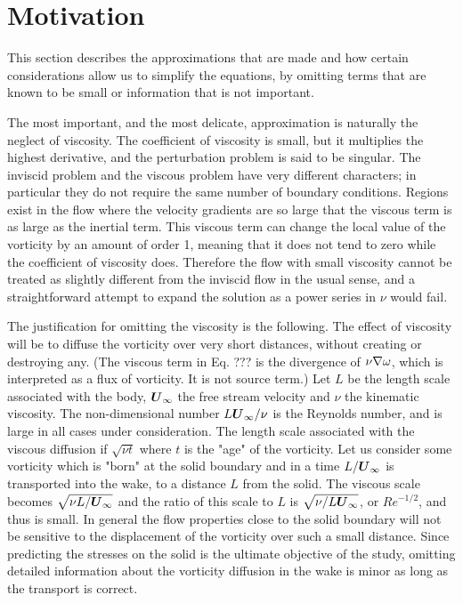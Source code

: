 



\section{Motivation}
This section describes the approximations that are made and how certain considerations allow us to simplify the equations, by omitting terms that are known to be small or information that is not important.

The most important, and the most delicate, approximation is naturally the neglect of viscosity.
The coefficient of viscosity is small, but it multiplies the highest derivative, and the perturbation problem is said to be singular.
The inviscid problem and the viscous problem have very different characters; in particular they do not require the same number of boundary conditions.
Regions exist in the flow where the velocity gradients are so large that the viscous term is as large as the inertial term.
This viscous term can change the local value of the vorticity by an amount of order 1, meaning that it does not tend to zero while the coefficient of viscosity does.
Therefore the flow with small viscosity cannot be treated as slightly different from the inviscid flow in the usual sense, and a straightforward attempt to expand the solution as a power series in $\nu$ would fail.

The justification for omitting the viscosity is the following.
The effect of viscosity will be to diffuse the vorticity over very short distances, without creating or destroying any.
(The viscous term in Eq. ??? is the divergence of $\nu \nabla \omega$, which is interpreted as a flux of vorticity. It is not source term.)
Let $L$ be the length scale associated with the body, $\boldsymbol{U}_{\infty}$ the free stream velocity and $\nu$ the kinematic viscosity.
The non-dimensional number $L\boldsymbol{U}_{\infty}/\nu$ is the Reynolds number, and is large in all cases under consideration.
The length scale associated with the viscous diffusion if $\sqrt{\nu t}$ where $t$ is the "age" of the vorticity.
Let us consider some vorticity which is "born" at the solid boundary and in a time $L/\boldsymbol{U}_{\infty}$ is transported into the wake, to a distance $L$ from the solid.
The viscous scale becomes $\sqrt{\nu L/\boldsymbol{U}_{\infty}}$ and the ratio of this scale to $L$ is $\sqrt{\nu/L\boldsymbol{U}_{\infty}}$, or $Re^{-1/2}$, and thus is small.
In general the flow properties close to the solid boundary will not be sensitive to the displacement of the vorticity over such a small distance.
Since predicting the stresses on the solid is the ultimate objective of the study, omitting detailed information about the vorticity diffusion in the wake is minor as long as the transport is correct.

